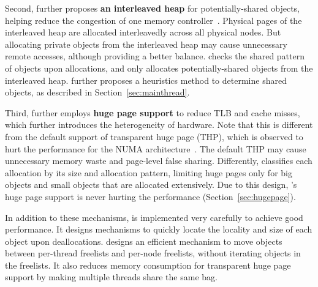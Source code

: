 Second, \NM{} further proposes \textbf{an interleaved heap} for potentially-shared objects, helping reduce the congestion of one memory controller~\cite{Blagodurov:2011:CNC:2002181.2002182}. Physical pages of the interleaved heap are allocated interleavedly across all physical nodes. But allocating private objects from the interleaved heap may  cause unnecessary remote accesses, although providing a better balance. 
\NM{} checks the shared pattern of objects upon allocations, and only allocates potentially-shared objects from the interleaved heap. \NM{} further proposes a heuristics method to determine shared objects, as described in Section~\ref{sec:mainthread}. 

 Third, \NM{} further employs \textbf{huge page support} to reduce TLB and cache misses, which further introduces the heterogeneity of hardware. Note that this is different from the default support of transparent huge page (THP), which is observed to hurt the performance for the NUMA architecture~\cite{Gaud:2014:LPM:2643634.2643659, DBLP:conf/asplos/PanwarBG19}. The default THP may cause unnecessary memory waste and page-level false sharing. Differently, \NM{} classifies each allocation by its size and allocation pattern, limiting huge pages only for big objects and small objects that are allocated extensively. 
 Due to this design, \NM{}'s huge page support is never hurting the performance (Section~\ref{sec:hugepage}). 
 
 In addition to these mechanisms, \NM{} is implemented very carefully to achieve good performance. It designs mechanisms to quickly locate the locality and size of each object upon deallocations. \NM{} designs an efficient mechanism to move objects between per-thread freelists and  per-node freelists, without iterating objects in the freelists. It also reduces  memory consumption for transparent huge page support by making multiple threads share the same bag. 
 



